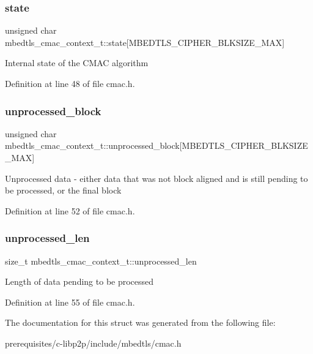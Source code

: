 \subsubsection{\texorpdfstring{state}{state}}
{\footnotesize\ttfamily unsigned char mbedtls\+\_\+cmac\+\_\+context\+\_\+t\+::state\mbox{[}M\+B\+E\+D\+T\+L\+S\+\_\+\+C\+I\+P\+H\+E\+R\+\_\+\+B\+L\+K\+S\+I\+Z\+E\+\_\+\+M\+AX\mbox{]}}

Internal state of the C\+M\+AC algorithm 

Definition at line 48 of file cmac.\+h.

\mbox{\label{structmbedtls__cmac__context__t_a2d58c18be7180b1284a06f2a29291663}} 
\subsubsection{\texorpdfstring{unprocessed\+\_\+block}{unprocessed\_block}}
{\footnotesize\ttfamily unsigned char mbedtls\+\_\+cmac\+\_\+context\+\_\+t\+::unprocessed\+\_\+block\mbox{[}M\+B\+E\+D\+T\+L\+S\+\_\+\+C\+I\+P\+H\+E\+R\+\_\+\+B\+L\+K\+S\+I\+Z\+E\+\_\+\+M\+AX\mbox{]}}

Unprocessed data -\/ either data that was not block aligned and is still pending to be processed, or the final block 

Definition at line 52 of file cmac.\+h.

\mbox{\label{structmbedtls__cmac__context__t_a96b77ca1c7dba6980356a37086870fab}} 
\subsubsection{\texorpdfstring{unprocessed\+\_\+len}{unprocessed\_len}}
{\footnotesize\ttfamily size\+\_\+t mbedtls\+\_\+cmac\+\_\+context\+\_\+t\+::unprocessed\+\_\+len}

Length of data pending to be processed 

Definition at line 55 of file cmac.\+h.



The documentation for this struct was generated from the following file\+:\begin{DoxyCompactItemize}
\item 
prerequisites/c-\/libp2p/include/mbedtls/cmac.\+h\end{DoxyCompactItemize}
